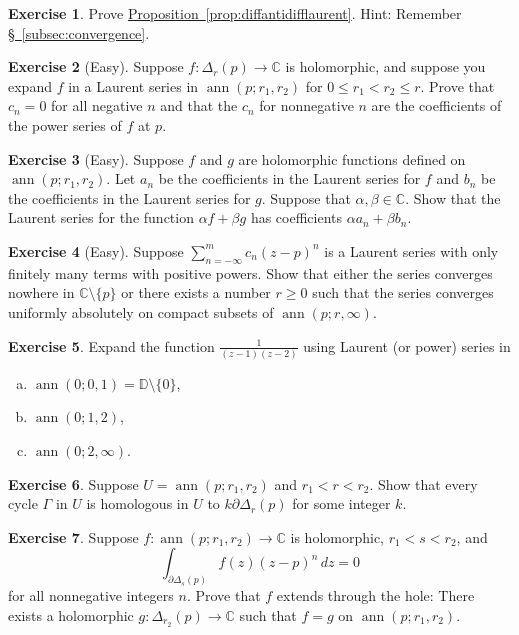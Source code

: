 \documentclass[12pt,openany]{book}
\newcommand{\ann}{\operatorname{ann}}
\newcommand{\C}{{\mathbb{C}}}
\newcommand{\D}{{\mathbb{D}}}
\theoremstyle{plain}
\theoremstyle{remark}
\theoremstyle{definition}
\newenvironment{exbox}{%
    \def\FrameCommand{\vrule width 1pt \relax\hspace{10pt}}%
    \MakeFramed{\advance\hsize-\width\FrameRestore}%
}{%
    \endMakeFramed
}
\newenvironment{exparts}{%
    \leavevmode\begin{enumerate}[a),noitemsep,topsep=0pt,parsep=0pt,partopsep=0pt]
}{%
    \end{enumerate}
}
\theoremstyle{exercise}
\newtheorem{exercise}{Exercise}[section]
\theoremstyle{example}
\newcommand{\subsectionref}[1]{\hyperref[#1]{\S~\ref*{#1}}}
\newcommand{\propref}[1]{\hyperref[#1]{Proposition~\ref*{#1}}}
\begin{document}
\begin{exbox}
\begin{exercise}
Prove \propref{prop:diffantidifflaurent}.
Hint: Remember \subsectionref{subsec:convergence}.
\end{exercise}

\begin{exercise}[Easy]
Suppose $f \colon \Delta_r(p) \to \C$ is holomorphic, and suppose you expand
$f$ in a Laurent series in $\ann(p;r_1,r_2)$ for $0 \leq r_1 < r_2 \leq r$.
Prove that $c_n = 0$ for all negative $n$
and that the $c_n$ for nonnegative $n$
are the coefficients of the power series of $f$ at $p$.
\end{exercise}

\begin{exercise}[Easy]
Suppose $f$ and $g$ are holomorphic functions defined on
$\ann(p;r_1,r_2)$.  Let $a_n$ be the coefficients in the Laurent series for
$f$ and $b_n$ be the coefficients in the Laurent series for $g$.  Suppose
that $\alpha,\beta \in \C$.  Show that the Laurent series for the function
$\alpha f + \beta g$ has coefficients $\alpha a_n + \beta b_n$.
\end{exercise}

\begin{exercise}[Easy]
Suppose $\sum_{n=-\infty}^m c_n {(z-p)}^n$ is a Laurent series with only
finitely many terms with positive powers.
Show that either the series converges
nowhere in $\C \setminus \{ p \}$ or there exists a number $r \geq 0$ such that the series
converges uniformly absolutely on compact subsets of
$\ann(p;r,\infty)$.
\end{exercise}

\begin{exercise}
Expand the function $\frac{1}{(z-1)(z-2)}$ using Laurent (or power) series in 
\begin{exparts}
\item $\ann(0;0,1) = \D \setminus \{ 0 \}$,
\item $\ann(0;1,2)$,
\item $\ann(0;2,\infty)$.
\end{exparts}
\end{exercise}

\begin{exercise}
Suppose $U = \ann(p;r_1,r_2)$ and $r_1 < r < r_2$.
Show that every cycle $\Gamma$ in $U$ is homologous in $U$
to $k \partial \Delta_r(p)$ for some integer $k$.
\end{exercise}

\begin{exercise}
Suppose $f \colon \ann(p;r_1,r_2) \to \C$ is holomorphic,
$r_1 < s < r_2$, and
\begin{equation*}
\int_{\partial \Delta_{s}(p)} f(z){(z-p)}^n
 \, dz = 0
\end{equation*}
for all nonnegative integers $n$.  Prove that $f$ extends through the hole:
There exists a holomorphic $g \colon \Delta_{r_2}(p) \to \C$ such that 
$f = g$ on $\ann(p;r_1,r_2)$.
\end{exercise}


\end{exbox}
\end{document}
